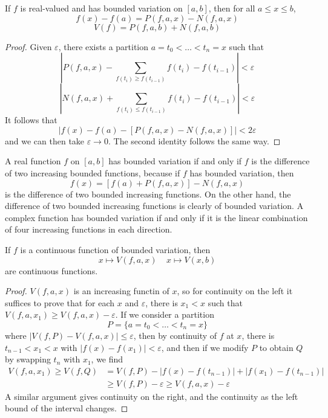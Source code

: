 \begin{lemma}
    If $f$ is real-valued and has bounded variation on $[a,b]$, then for all $a \leq x \leq b$,
    \[ f(x) - f(a) = P(f,a,x) - N(f,a,x) \]
    \[ V(f) = P(f,a,b) + N(f,a,b) \]
\end{lemma}
\begin{proof}
    Given $\varepsilon$, there exists a partition $a = t_0 < \dots < t_n = x$ such that
    \[ \left| P(f,a,x) - \sum_{f(t_i) \geq f(t_{i-1})} f(t_i) - f(t_{i-1}) \right| < \varepsilon \]
    \[ \left| N(f,a,x) + \sum_{f(t_i) \leq f(t_{i-1})} f(t_i) - f(t_{i-1}) \right| < \varepsilon \]
    It follows that
    \[ |f(x) - f(a) - [P(f,a,x) - N(f,a,x)]| < 2 \varepsilon \]
    and we can then take $\varepsilon \to 0$. The second identity follows the same way.
\end{proof}

A real function $f$ on $[a,b]$ has bounded variation if and only if $f$ is the difference of two increasing bounded functions, because if $f$ has bounded variation, then
%
\[ f(x) = [f(a) + P(f,a,x)] - N(f,a,x) \]
%
is the difference of two bounded increasing functions. On the other hand, the difference of two bounded increasing functions is clearly of bounded variation. A complex function has bounded variation if and only if it is the linear combination of four increasing functions in each direction.

\begin{theorem}
    If $f$ is a continuous function of bounded variation, then
    \[ x \mapsto V(f,a,x) \ \ \ \ \ x \mapsto V(x,b) \]
    are continuous functions.
\end{theorem}
\begin{proof}
    $V(f,a,x)$ is an increasing functin of $x$, so for continuity on the left it suffices to prove that for each $x$ and $\varepsilon$, there is $x_1 < x$ such that $V(f,a,x_1) \geq V(f,a,x) - \varepsilon$. If we consider a partition
    \[ P = \{ a = t_0 <  \dots < t_n = x \} \]
    where $|V(f,P) - V(f,a,x)| \leq \varepsilon$, then by continuity of $f$ at $x$, there is $t_{n-1} < x_1 < x$ with $|f(x) - f(x_1)| < \varepsilon$, and then if we modify $P$ to obtain $Q$ by swapping $t_n$ with $x_1$, we find
    \begin{align*}
        V(f,a,x_1) \geq V(f,Q) &= V(f,P) - |f(x) - f(t_{n-1})| + |f(x_1) - f(t_{n-1})|\\
        &\geq V(f,P) - \varepsilon \geq V(f,a,x) - \varepsilon
    \end{align*}
    A similar argument gives continuity on the right, and the continuity as the left bound of the interval changes.
\end{proof}

